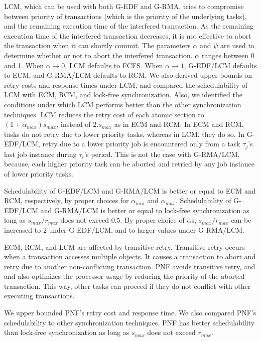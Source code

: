 \documentclass[12pt,english]{report}
\begin{document}
LCM, which can be used with both G-EDF and G-RMA, tries to compromise between priority of transactions (which is the priority of the underlying tasks), and the remaining execution time of the interfered transaction. As the remaining execution time of the interfered transaction decreases, it is not effective to abort the transaction when it can shortly commit. The parameters $\alpha$ and $\psi$ are used to determine whether or not to abort the interfered transaction. $\alpha$ ranges between 0 and 1. When $\alpha \rightarrow 0$, LCM defaults to FCFS. When $\alpha\rightarrow1$, G-EDF/LCM defaults to ECM, and G-RMA/LCM defaults to RCM. We also derived upper bounds on retry costs and response times under LCM, and compared the schedulability of LCM with ECM, RCM, and lock-free synchronization. Also, we identified the conditions under which LCM performs better than the other synchronization techniques. LCM reduces the retry cost  of each atomic section to $(1+\alpha_{max})s_{max}$, instead of $2.s_{max}$ as in ECM and RCM. In ECM and RCM, tasks do not retry due to lower priority tasks, whereas in LCM, they do so. In G-EDF/LCM, retry due to a lower priority job is encountered only from a task $\tau_{j}$'s last job instance during $\tau_{i}$'s period. This is not the case with G-RMA/LCM, because,  each higher priority task can be aborted and retried by any job instance of lower priority tasks. 

Schedulability of G-EDF/LCM and G-RMA/LCM is better or equal to ECM and RCM, respectively, by proper choices for $\alpha_{min}$ and $\alpha_{max}$. Schedulability of G-EDF/LCM and G-RMA/LCM is better or equal to lock-free synchronization as long as $s_{max}/r_{max}$ does not exceed 0.5. By proper choice of $\alpha$s, $s_{max}/r_{max}$ can be increased to 2 under G-EDF/LCM, and to larger values under G-RMA/LCM.

ECM, RCM, and LCM are affected by transitive retry. Transitive retry occurs when a transaction accesses multiple objects. It causes a transaction to abort and retry  due to another non-conflicting transaction. PNF avoids transitive retry, and and also optimizes the processor usage by reducing the priority of the aborted transaction. This way, other tasks can proceed if they do not conflict with other executing transactions. 

We upper bounded PNF's retry cost and response time. We also compared PNF's schedulability to other synchronization techniques. PNF has better schedulability than lock-free synchronization as long as $s_{max}$ does not exceed $r_{max}$. 
\end{document}
